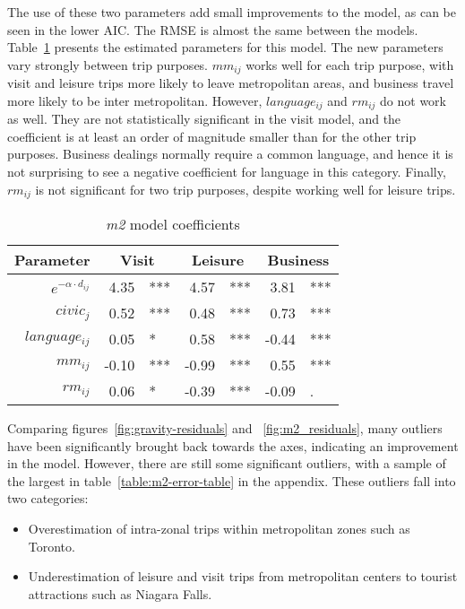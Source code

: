 The use of these two parameters add small improvements to the model, as can be seen in the lower AIC. The RMSE is almost the same between the models. Table~\ref{table:m2-coeff} presents the estimated parameters for this model. The new parameters vary strongly between trip purposes. 
$mm_{ij}$  works well for each trip purpose, with visit and leisure trips more likely to leave metropolitan areas, and business travel more likely to be inter metropolitan. However, $language_{ij}$ and $rm_{ij}$  do not work as well. They are not statistically significant in the visit model, and the coefficient is at least an order of magnitude smaller than for the other trip purposes. Business dealings normally require a common language, and hence it is not surprising to see a negative coefficient for language in this category. Finally, $rm_{ij}$  is not significant for two trip purposes, despite working well for leisure trips. 

\begin{table}[H]
\centering
\caption{\textit{m2} model coefficients}
\label{table:m2-coeff}
\begin{tabular}{@{}rrlrlrl@{}}
  \toprule
 Parameter & \multicolumn{2}{c}{Visit} & \multicolumn{2}{c}{Leisure} & \multicolumn{2}{c}{Business} \\ \midrule
  $e^{-\alpha  \cdot d_{ij}}$ 	& 4.35 & *** & 4.57 & *** & 3.81 & *** \\  
  $civic_j$ 		& 0.52 	& *** & 0.48 & *** & 0.73 & *** \\  
  $language_{ij}$ 	& 0.05 & * & 0.58 & *** & -0.44 & *** \\ 
  $mm_{ij}$  		& -0.10 & *** & -0.99 & *** & 0.55 & *** \\ 
  $rm_{ij}$			& 0.06 & * & -0.39 & *** & -0.09 & . \\  
   \bottomrule
\end{tabular}
\end{table}

Comparing figures~\ref{fig:gravity-residuals} and ~\ref{fig:m2_residuals}, many outliers have been significantly brought back towards the axes, indicating an improvement in the model. However, there are still some significant outliers, with a sample of the largest in table~\ref{table:m2-error-table} in the appendix. These outliers fall into two categories:
\begin{itemize}
\item Overestimation of intra-zonal trips within metropolitan zones such as Toronto.
\item Underestimation of leisure and visit trips from metropolitan centers to tourist attractions such as Niagara Falls.
\end{itemize}

